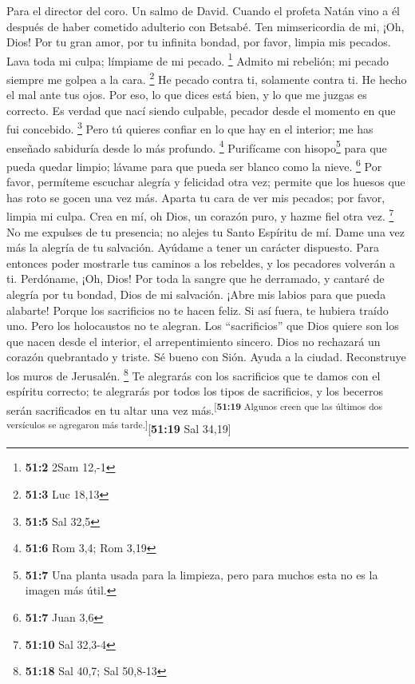 Para el director del coro. Un salmo de David. Cuando el profeta Natán
vino a él después de haber cometido adulterio con Betsabé.
 Ten mimsericordia de mi, ¡Oh, Dios! Por tu gran amor, por
tu infinita bondad, por favor, limpia mis pecados.  Lava
toda mi culpa; límpiame de mi pecado. \footnote{\textbf{51:2} 2Sam 12,-1}
 Admito mi rebelión; mi pecado siempre me golpea a la
cara. \footnote{\textbf{51:3} Luc 18,13}  He pecado contra
ti, solamente contra ti. He hecho el mal ante tus ojos. Por eso, lo que
dices está bien, y lo que me juzgas es correcto.  Es
verdad que nací siendo culpable, pecador desde el momento en que fui
concebido. \footnote{\textbf{51:5} Sal 32,5}  Pero tú
quieres confiar en lo que hay en el interior; me has enseñado sabiduría
desde lo más profundo. \footnote{\textbf{51:6} Rom 3,4; Rom 3,19}
 Purifícame con hisopo\footnote{\textbf{51:7} Una planta
  usada para la limpieza, pero para muchos esta no es la imagen más
  útil.} para que pueda quedar limpio; lávame para que pueda ser blanco
como la nieve. \footnote{\textbf{51:7} Juan 3,6}  Por
favor, permíteme escuchar alegría y felicidad otra vez; permite que los
huesos que has roto se gocen una vez más.  Aparta tu cara
de ver mis pecados; por favor, limpia mi culpa.  Crea en
mí, oh Dios, un corazón puro, y hazme fiel otra vez. \footnote{\textbf{51:10}
  Sal 32,3-4}  No me expulses de tu presencia; no alejes
tu Santo Espíritu de mí.  Dame una vez más la alegría de
tu salvación. Ayúdame a tener un carácter dispuesto. 
Para entonces poder mostrarle tus caminos a los rebeldes, y los
pecadores volverán a ti.  Perdóname, ¡Oh, Dios! Por toda
la sangre que he derramado, y cantaré de alegría por tu bondad, Dios de
mi salvación.  ¡Abre mis labios para que pueda alabarte!
 Porque los sacrificios no te hacen feliz. Si así fuera,
te hubiera traído uno. Pero los holocaustos no te alegran.
 Los ``sacrificios'' que Dios quiere son los que nacen
desde el interior, el arrepentimiento sincero. Dios no rechazará un
corazón quebrantado y triste.  Sé bueno con Sión. Ayuda a
la ciudad. Reconstruye los muros de Jerusalén. \footnote{\textbf{51:18}
  Sal 40,7; Sal 50,8-13}  Te alegrarás con los
sacrificios que te damos con el espíritu correcto; te alegrarás por
todos los tipos de sacrificios, y los becerros serán sacrificados en tu
altar una vez más.\textsuperscript{{[}\textbf{51:19} Algunos creen que
las últimos dos versículos se agregaron más tarde.{]}}{[}\textbf{51:19}
Sal 34,19{]}

